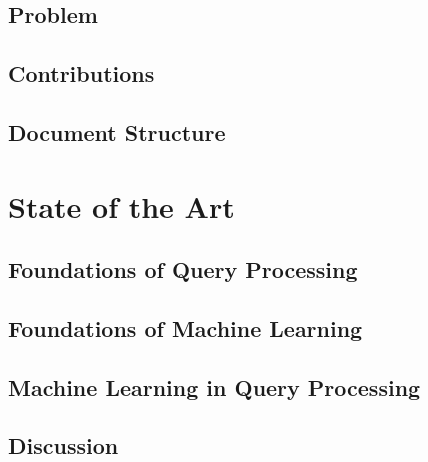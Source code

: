 \documentclass[12pt]{report}
\begin{document}
    \section{Problem}
    	
    
    \section{Contributions}
        
        
    \section{Document Structure}
        

\chapter{State of the Art}

    
    
    \section{Foundations of Query Processing}
    
        
            
    \section{Foundations of Machine Learning}
    
        
        
    \section{Machine Learning in Query Processing}
    
        
        
    \section{Discussion}
    
        
        
\end{document}
